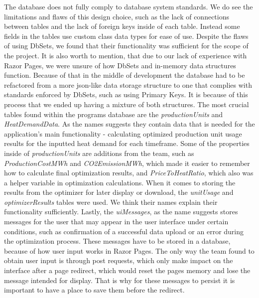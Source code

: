\documentclass[12pt]{report}
\begin{document}
The database does not fully comply to database system standards. 
We do see the limitations and flaws of this design choice, such as the lack of connections between tables and the 
lack of foreign keys inside of each table. Instead some fields in the tables use custom class data types for ease of use. Despite the flaws
of using DbSets, we found that their functionality was sufficient for the scope of the project. It is also worth to mention, that due
to our lack of experience with Razor Pages, we were unsure of how DbSets and in-memory data structures function. Because of that in the
middle of development the database had to be refactored from a more json-like data storage structure to one that complies
with standards enforced by DbSets, such as using Primary Keys. It is because of this process that we ended up having a mixture of both structures.
The most crucial tables found within the programs database are the \textit{productionUnits} and \textit{HeatDemandData}. As the names suggests
they contain data that is needed for the application's main functionality - calculating optimized production unit usage results for 
the inputted heat demand for each timeframe. Some of the properties inside of \textit{productionUnits} are additions from the team, such as
\textit{ProductionCostMWh} and \textit{CO2EmissionMWh}, which made it easier to remember how to calculate final optimization results, and
\textit{PriceToHeatRatio}, which also was a helper variable in optimization calculations.
When it comes to storing the results from the optimizer for later display or download, the \textit{unitUsage} and \textit{optimizerResults} tables were used.
We think their names explain their functionality sufficiently.
Lastly, the \textit{uiMessages}, as the name suggests stores messages for the user that may appear in the user interface under certain conditions, such as 
confirmation of a successful data upload or an error during the optimization process.
These messages have to be stored in a database, because of how user input works in Razor Pages. The only way the team found to obtain user input is through
post requests, which only make impact on the interface after a page redirect, which would reset the pages memory and lose the message intended for display.
That is why for these messages to persist it is important to have a place to save them before the redirect.
\end{document}
